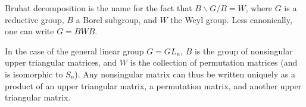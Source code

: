 \documentclass[12pt]{article}
\begin{document}
Bruhat decomposition is the name for the fact that $B\backslash G/B = W$, where $G$ is a reductive group, $B$ a Borel subgroup, and $W$ the Weyl group.  Less canonically, one can write $G = BWB$.

In the case of the general linear group $G = GL_n$, $B$ is the group of nonsingular upper triangular matrices, and $W$ is the collection of permutation matrices (and is isomorphic to $S_n$).  Any nonsingular matrix can thus be written uniquely as a product of an upper triangular matrix, a permutation matrix, and another upper triangular matrix.
\end{document}

